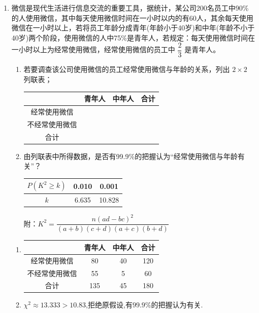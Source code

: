 \begin{enumerate}
\item 微信是现代生活进行信息交流的重要工具，据统计，某公司200名员工中90\%的人使用微信，其中每天使用微信时间在一小时以内的有60人，其余每天使用微信在一小时以上，若将员工年龄分成青年(年龄小于40岁)和中年(年龄不小于40岁)两个阶段，使用微信的人中75\%是青年人，若规定：每天使用微信时间在一小时以上为经常使用微信，经常使用微信的员工中 $\dfrac{2}{3}$ 是青年人。
\begin{enumerate}
\item 若要调查该公司使用微信的员工经常使用微信与年龄的关系，列出 $2\times 2$ 列联表；
\begin{center}
\begin{tabular}{|c|c|c|c|}
\hline
 & 青年人 & 中年人 & 合计 \\
\hline
经常使用微信 & & & \\
\hline
不经常使用微信 & & & \\
\hline
合计 & & & \\
\hline
\end{tabular}
\end{center}
\item 由列联表中所得数据，是否有99.9\%的把握认为“经常使用微信与年龄有关”？
\begin{center}
\begin{tabular}{|c|c|c|}
\hline
$P(K^{2}\ge k)$ & 0.010 & 0.001 \\
\hline
$k$ & 6.635 & 10.828 \\
\hline
\end{tabular}
\end{center}
附：$K^{2}=\dfrac{n(ad-bc)^{2}}{(a+b)(c+d)(a+c)(b+d)}$
\end{enumerate}
\begin{jieda}
    \begin{enumerate}
        \item \begin{center}
\begin{tabular}{|c|c|c|c|}
\hline
 & 青年人 & 中年人 & 合计 \\
\hline
经常使用微信 & 80&40 &120 \\
\hline
不经常使用微信 &55 & 5&60 \\
\hline
合计 & 135 &45 &180 \\
\hline
\end{tabular}
\end{center}

\item  $\chi^2\approx 13.333> 10.83$,拒绝原假设,有$99.9\%$的把握认为有关.
    \end{enumerate}
\end{jieda}

\end{enumerate}